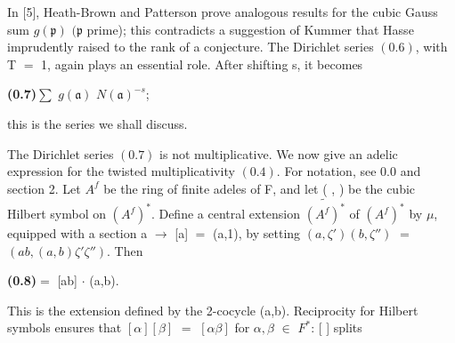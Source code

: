 \documentclass[10pt,a4paper]{article}
\begin{document}
\par In [5], Heath-Brown and Patterson prove analogous results for the cubic Gauss sum $g(\mathfrak{p})$ $(\mathfrak{p}$ prime); this contradicts a suggestion of Kummer that Hasse imprudently raised to the rank of a conjecture. The Dirichlet series $(0.6)$, with T $=$ 1, again plays an essential role. After shifting s, it becomes\par
\par\noindent\textbf{(0.7)}\quad $\sum{}$ $g(\mathfrak{a})$ $N(\mathfrak{a})^{-s}$;\par
\par this is the series we shall discuss.\par
\par The Dirichlet series $(0.7)$ is not multiplicative. We now give an adelic expression for the twisted multiplicativity $(0.4)$. For notation, see $0.0$ and section 2. Let $A^f$ be the ring of finite adeles of F, and let ( , ) be the cubic Hilbert symbol on $(A^f)^*$. Define a central extension $\widetilde{(A^f)^*}$ of $(A^f)^*$ by $\mu{}$, equipped with a section a $\to{}$ [a] $=$ (a,1), by setting $(a,\zeta{}')(b,\zeta{}'')$ $=$ $(ab,(a,b)\zeta{}'\zeta{}'')$. Then\par
\par\noindent\textbf{(0.8)}\quad [a] [b] $=$ [ab] $\cdot{}$ (a,b).\par
\par This is the extension defined by the 2-cocycle (a,b). Reciprocity for Hilbert symbols ensures that $[\alpha{}][\beta{}]$ $=$ $[\alpha{}\beta{}]$ for $\alpha{},\beta{}$ $\in{}$ $F^*$: [ ] splits\par
\end{document}
